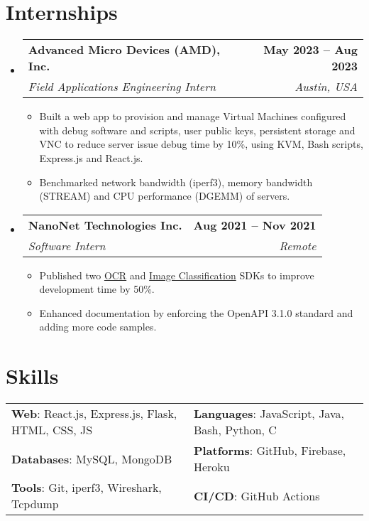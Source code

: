 \documentclass[letterpaper,11pt]{article}
\makeatletter
\newcommand{\resumeItem}[1]{
  \item\small{
    {#1 \vspace{-2pt}}
  }
}
\newcommand{\resumeSubheading}[4]{
  \vspace{-2pt}\item
    \begin{tabular*}{1.0\textwidth}[t]{l@{\extracolsep{\fill}}r}
      \vspace{-2pt}\textbf{#1} & \textbf{\small #2} \\
      \textit{\small#3} & \textit{\small #4} \\
    \end{tabular*}\vspace{-7pt}
}
\newcommand{\resumeSubHeadingListStart}{\begin{itemize}[leftmargin=0.0in, label={}]}
\newcommand{\resumeSubHeadingListEnd}{\end{itemize}}
\newcommand{\resumeItemListStart}{\begin{itemize}}
\newcommand{\resumeItemListEnd}{\end{itemize}\vspace{-5pt}}
\makeatother
\begin{document}
\section{Internships}
    \resumeSubHeadingListStart
        \resumeSubheading
            {Advanced Micro Devices (AMD), Inc.}{May 2023 -- Aug 2023}
            {Field Applications Engineering Intern}{Austin, USA}
            \resumeItemListStart
                \resumeItem{Built a web app to provision and manage Virtual Machines configured with debug software and scripts, user public keys, persistent storage and VNC to reduce server issue debug time by 10\%, using KVM, Bash scripts, Express.js and React.js.}
                \resumeItem{Benchmarked network bandwidth (iperf3), memory bandwidth (STREAM) and CPU performance (DGEMM) of servers.}
            \resumeItemListEnd

        \resumeSubheading
            {NanoNet Technologies Inc.}{Aug 2021 -- Nov 2021}
            {Software Intern}{Remote}
            \resumeItemListStart
                \resumeItem{Published two \href{https://www.npmjs.com/package/@nanonets/optical-character-recognition}{OCR} and \href{https://www.npmjs.com/package/@nanonets/image-classification}{Image Classification} SDKs to improve development time by 50\%.}
                \resumeItem{Enhanced documentation by enforcing the OpenAPI 3.1.0 standard and adding more code samples.}
            \resumeItemListEnd
    \resumeSubHeadingListEnd
\vspace{-15pt}


\section{Skills}
    \vspace{-2pt}
    \begin{itemize}[leftmargin=0.2in, label={}]
        {\item{
            \begin{tabular}{ l@{\hskip 0.2in} l }
                 \textbf{Web}: React.js, Express.js, Flask, HTML, CSS, JS & \textbf{Languages}: JavaScript, Java, Bash, Python, C \\ 
                 \textbf{Databases}: MySQL, MongoDB & \textbf{Platforms}: GitHub, Firebase, Heroku \\  
                 \textbf{Tools}: Git, iperf3, Wireshark, Tcpdump & \textbf{CI/CD}: GitHub Actions
            \end{tabular}
        }}
    \end{itemize}
\vspace{-20pt}
\end{document}
